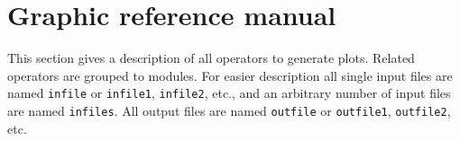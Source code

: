 \chapter{\label{refman}Graphic reference manual}

This section gives a description of all {\CDO} operators to generate plots.
Related operators are grouped to modules.
For easier description all single input files are named \texttt{infile} or \texttt{infile1}, \texttt{infile2}, etc.,
and an arbitrary number of input files are named \texttt{infiles}.
All output files are named \texttt{outfile} or \texttt{outfile1}, \texttt{outfile2}, etc.


\hspace{3mm}



